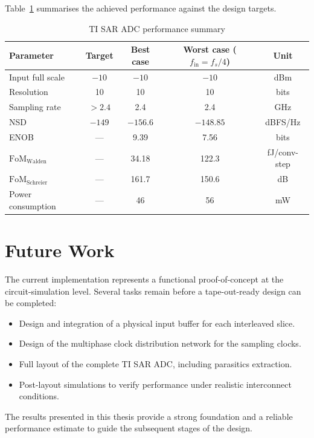 Table~\ref{tab:summary} summarises the achieved performance against the design targets.

\begin{table}[h!]
	\centering
	\caption{TI SAR ADC performance summary}
	\label{tab:summary}
	\renewcommand{\arraystretch}{1.3}
	\begin{tabular}{lcccc}
		\toprule
		\textbf{Parameter} & \textbf{Target} & \textbf{Best case} &
		\textbf{Worst case} ($f_{\mathrm{in}} = f_s/4$) & \textbf{Unit} \\
		\midrule
		Input full scale      & $-10$  & $-10$   & $-10$   & dBm \\
		Resolution            & 10     & 10      & 10      & bits \\
		Sampling rate         & $>2.4$ & 2.4     & 2.4     & GHz \\
		NSD                   & $-149$ & $-156.6$ & $-148.85$ & dBFS/Hz \\
		ENOB                  & ---    & 9.39    & 7.56    & bits \\
		$\mathrm{FoM_{Walden}}$  & ---  & 34.18    & 122.3   & fJ/conv-step \\
		$\mathrm{FoM_{Schreier}}$ & --- & 161.7  & 150.6   & dB \\
		Power consumption     & ---    & 46    & 56    & mW \\
		\bottomrule
	\end{tabular}
\end{table}

\section{Future Work}

The current implementation represents a functional proof-of-concept at the circuit-simulation
level. Several tasks remain before a tape-out-ready design can be completed:

\begin{itemize}
	\item Design and integration of a physical input buffer for each interleaved slice.
	\item Design of the multiphase clock distribution network for the sampling clocks.
	\item Full layout of the complete TI SAR ADC, including parasitics extraction.
	\item Post-layout simulations to verify performance under realistic interconnect conditions.
\end{itemize}

The results presented in this thesis provide a strong foundation and a reliable performance
estimate to guide the subsequent stages of the design.




